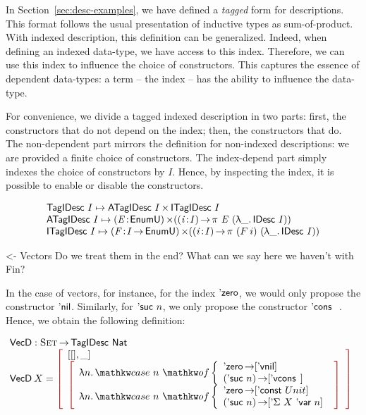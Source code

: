 In Section~\ref{sec:desc-examples}, we have defined a \emph{tagged}
form for descriptions. This format follows the usual presentation of
inductive types as sum-of-product. With indexed description, this
definition can be generalized. Indeed, when defining an indexed
data-type, we have access to this index. Therefore, we can use this
index to influence the choice of constructors. This captures the
essence of dependent data-types: a term -- the index -- has the
ability to influence the data-type.

For convenience, we divide a tagged indexed description in two parts:
first, the constructors that do not depend on the index; then, the
constructors that do. The non-dependent part mirrors the definition
for non-indexed descriptions: we are provided a finite choice of
constructors. The index-depend part simply indexes the choice of
constructors by $I$. Hence, by inspecting the index, it is possible to
enable or disable the constructors. 

\[\stk{
 \TagIDesc{I}  \mapsto \TIMES{\ATagIDesc{I}}{\ITagIDesc{I}} \\
 \ATagIDesc{I} \mapsto \SIGMA{\V{E}}{\EnumU} (\PI{\V{i}}{I} \spi{\V{E}}{(\LAM{\_} \IDesc{I})}) \\
 \ITagIDesc{I} \mapsto \SIGMA{\V{F}}{I \To \EnumU} (\PI{\V{i}}{I} \spi{(F\: i)}{(\LAM{\_} \IDesc{I})}) 
}\]


\begin{wstructure}
<- Vectors
    Do we treat them in the end? 
    What can we say here we haven't with Fin?
\end{wstructure}

In the case of vectors, for instance, for the index $\NatZero$, we
would only propose the constructor $\ListNil$. Similarly, for
$\NatSuc{n}$, we only propose the constructor $\ListCons{}{}$. Hence,
we obtain the following definition:

\newcommand{\VecD}{\C{VecD}}
\newcommand{\VecNil}{\etag{\CN{vnil}}}
\newcommand{\VecCons}[2]{\etag{\CN{vcons}}\:#1\:#2}

\[\stk{
\VecD : \Set \To \TagIDesc{\Nat} \\
\begin{array}{@{}ll}
\VecD\: X = \bigRedBracket{ 
            \begin{array}{l}
                \pair{[]}{\_}{} \\
                \bigRedBracket{
                \begin{array}{l} 
                  \LAM{n} \caseB{n}{\NatZero \To [\VecNil] \\
                                   (\NatSuc n) \To [\VecCons{}{}]} \\
                  \LAM{n} \caseB{n}{\NatZero \To [\DConst{Unit}] \\
                                   (\NatSuc n) \To [\DSigma{X}{\DVar{n}}]}
                \end{array}}
            \end{array}}
\end{array}
}\]

